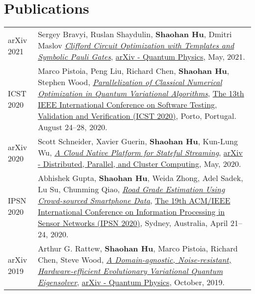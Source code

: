 \section{\sc Publications}

\renewcommand{\arraystretch}{1.8}

\begin{longtabu}{p{.51\sectionwidth} p{.78\resumewidth}}

{\sc arXiv 2021}\hypertarget{bravyi2021arxiv}{} &
Sergey Bravyi, Ruslan Shaydulin, \textbf{Shaohan Hu}, Dmitri Maslov
\href{https://arxiv.org/abs/2105.02291}{\emph{Clifford Circuit Optimization with Templates and Symbolic Pauli Gates}},
\href{https://arxiv.org/list/quant-ph/recent}{\textsf{arXiv - Quantum Physics}},
May, 2021. \\

{\sc ICST 2020}\hypertarget{pistoia2020icst}{} &
Marco Pistoia, Peng Liu, Richard Chen, \textbf{Shaohan Hu}, Stephen Wood,
\href{https://ieeexplore.ieee.org/abstract/document/9159094}{\emph{Parallelization of Classical Numerical Optimization in Quantum Variational Algorithms}},
\href{https://icst2020.info/}{\textsf{The 13th IEEE International Conference on Software Testing, Validation and Verification (ICST 2020)}},
Porto, Portugal. August 24--28, 2020. \\

{\sc arXiv 2020}\hypertarget{schneider2020arxiv}{} &
Scott Schneider, Xavier Guerin, \textbf{Shaohan Hu}, Kun-Lung Wu,
\href{https://arxiv.org/abs/2006.00064}{\emph{A Cloud Native Platform for Stateful Streaming}},
\href{https://arxiv.org/list/cs.DC/recent}{\textsf{arXiv - Distributed, Parallel, and Cluster Computing}},
May, 2020. \\

{\sc IPSN 2020}\hypertarget{gupta2020ipsn}{} &
Abhishek Gupta, \textbf{Shaohan Hu}, Weida Zhong, Adel Sadek, Lu Su, Chunming Qiao,
\href{https://ieeexplore.ieee.org/document/9111051}{\emph{Road Grade Estimation Using Crowd-sourced Smartphone Data}},
\href{http://ipsn.acm.org/2020/}{\textsf{The 19th ACM/IEEE International Conference on Information Processing in Sensor Networks (IPSN 2020)}},
Sydney, Australia, April 21--24, 2020. \\

{\sc arXiv 2019}\hypertarget{rattew2019arxiv}{} &
Arthur G. Rattew, \textbf{Shaohan Hu}, Marco Pistoia, Richard Chen, Steve Wood,
\href{https://arxiv.org/abs/1910.09694}{\emph{A Domain-agnostic, Noise-resistant, Hardware-efficient Evolutionary Variational Quantum Eigensolver}},
\href{https://arxiv.org/archive/quant-ph}{\textsf{arXiv - Quantum Physics}},
October, 2019. \\


\end{longtabu}
